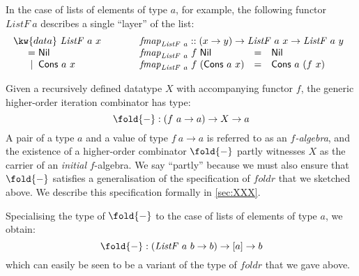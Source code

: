 In the case of lists of elements of type $a$, for example, the
following functor $\mathit{ListF}~a$ describes a single ``layer'' of
the list:
\begin{displaymath}
  \begin{array}{@{}l@{\hspace{3em}}l}
    \begin{array}{l}
      \kw{data}~\mathit{ListF}~a~x \\
      \quad
      \begin{array}{c@{\hspace{0.3em}}l}
        = & \mathsf{Nil} \\
        | & \mathsf{Cons}~a~x
      \end{array}
    \end{array}
    &
    \begin{array}{l}
      \mathit{fmap}_{\mathit{ListF}~a} :: (x \to y) \to \mathit{ListF}~a~x \to \mathit{ListF}~a~y \\
      \begin{array}{@{}l@{\hspace{0.3em}}l@{\hspace{0.3em}}lcl}
      \mathit{fmap}_{\mathit{ListF}~a}&f&\mathsf{Nil} &=& \mathsf{Nil} \\
      \mathit{fmap}_{\mathit{ListF}~a}&f&(\mathsf{Cons}~a~x) &=& \mathsf{Cons}~a~(f~x)
    \end{array}
    \end{array}
  \end{array}
\end{displaymath}

Given a recursively defined datatype $X$ with accompanying functor
$f$, the generic higher-order iteration combinator has type:
\begin{displaymath}
  \fold{-} : (f~a \to a) \to X \to a
\end{displaymath}
A pair of a type $a$ and a value of type $f~a \to a$ is referred to as
an \emph{$f$-algebra}, and the existence of a higher-order combinator
$\fold{-}$ partly witnesses $X$ as the carrier of an \emph{initial}
$f$-algebra. We say ``partly'' because we must also ensure that
$\fold{-}$ satisfies a generalisation of the specification of
$\mathit{foldr}$ that we sketched above. We describe this
specification formally in \autoref{sec:XXX}.

Specialising the type of $\fold{-}$ to the case of lists of elements
of type $a$, we obtain:
\begin{displaymath}
  \fold{-} : (\mathit{ListF}~a~b \to b) \to [a] \to b
\end{displaymath}
which can easily be seen to be a variant of the type of
$\mathit{foldr}$ that we gave above.

